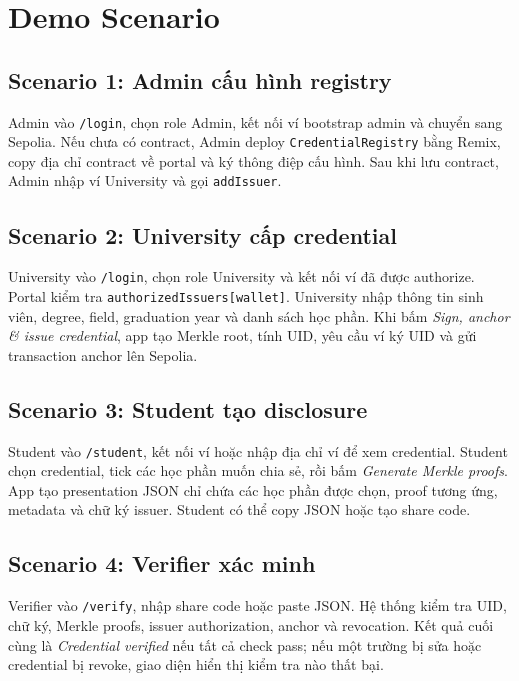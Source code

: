 \section{Demo Scenario}

\subsection{Scenario 1: Admin cấu hình registry}

Admin vào \texttt{/login}, chọn role Admin, kết nối ví bootstrap admin và chuyển sang Sepolia. Nếu chưa có contract, Admin deploy \texttt{CredentialRegistry} bằng Remix, copy địa chỉ contract về portal và ký thông điệp cấu hình. Sau khi lưu contract, Admin nhập ví University và gọi \texttt{addIssuer}.

\subsection{Scenario 2: University cấp credential}

University vào \texttt{/login}, chọn role University và kết nối ví đã được authorize. Portal kiểm tra \texttt{authorizedIssuers[wallet]}. University nhập thông tin sinh viên, degree, field, graduation year và danh sách học phần. Khi bấm \textit{Sign, anchor \& issue credential}, app tạo Merkle root, tính UID, yêu cầu ví ký UID và gửi transaction anchor lên Sepolia.

\subsection{Scenario 3: Student tạo disclosure}

Student vào \texttt{/student}, kết nối ví hoặc nhập địa chỉ ví để xem credential. Student chọn credential, tick các học phần muốn chia sẻ, rồi bấm \textit{Generate Merkle proofs}. App tạo presentation JSON chỉ chứa các học phần được chọn, proof tương ứng, metadata và chữ ký issuer. Student có thể copy JSON hoặc tạo share code.

\subsection{Scenario 4: Verifier xác minh}

Verifier vào \texttt{/verify}, nhập share code hoặc paste JSON. Hệ thống kiểm tra UID, chữ ký, Merkle proofs, issuer authorization, anchor và revocation. Kết quả cuối cùng là \textit{Credential verified} nếu tất cả check pass; nếu một trường bị sửa hoặc credential bị revoke, giao diện hiển thị kiểm tra nào thất bại.

